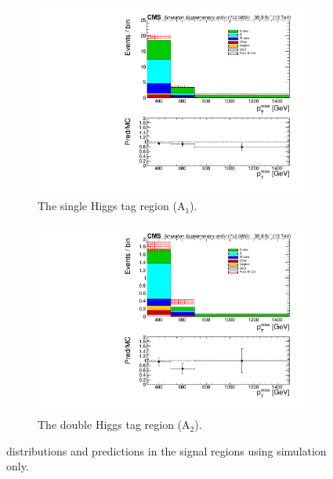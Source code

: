 \begin{figure}
\centering
\begin{subfigure}[b]{0.49\textwidth}
\centering
\includegraphics[trim={5px 5px 5px 5px},clip,width=0.99\textwidth]{figs/MCclosure_singleHiggsRegionTotal.pdf}
\caption{The single Higgs tag region (A$_{1}$).}
\end{subfigure}
\begin{subfigure}[b]{0.49\textwidth}
\centering
\includegraphics[trim={5px 5px 5px 5px},clip,width=0.99\textwidth]{figs/MCclosure_doubleHiggsRegionTotal.pdf} 
\caption{The double Higgs tag region (A$_{2}$).}
\end{subfigure}
\caption{\ptmiss distributions and predictions in the signal regions using simulation only.}
\label{fig:MCclosure}
\end{figure}

